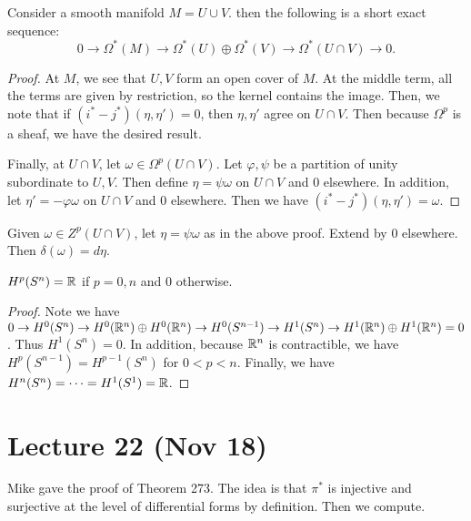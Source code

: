 \documentclass[twoside, 10pt]{article}
\begin{document}
    \begin{thm} Consider a smooth manifold $M = U \cup
        V$. then the following is a short exact sequence: \[ 0 \to \Omega^*(M)
        \to \Omega^*(U) \oplus \Omega^*(V) \to \Omega^*(U \cap V) \to 0.\]
    \end{thm}

    \begin{proof} At $M$, we see that $U,V$ form an open cover of $M$. At the
        middle term, all the terms are given by restriction, so the kernel
        contains the image. Then, we note that if $(i^* - j^*)(\eta, \eta') =
        0$, then $\eta, \eta'$ agree on $U \cap V$. Then because $\Omega^p$ is
        a sheaf, we have the desired result.

        Finally, at $U \cap V$, let $\omega \in \Omega^p(U \cap V)$. Let
    $\varphi, \psi$ be a partition of unity subordinate to $U,V$. Then define
$\eta = \psi \omega$ on $U \cap V$ and $0$ elsewhere. In addition, let $\eta' =
-\varphi\omega$ on $U \cap V$ and $0$ elsewhere. Then we have $(i^*-j^*)(\eta,
\eta') = \omega$.  \end{proof}

    \begin{cor} Given $\omega \in Z^p(U \cap V)$, let $\eta = \psi\omega$ as in
    the above proof. Extend by $0$ elsewhere. Then $\delta(\omega) = d\eta$.
\end{cor}

    \begin{thm} $H^p(S^n) = \mathbb{R}$ if $p = 0,n$ and  $0$ otherwise.  \end{thm}

    \begin{proof} Note we have $0 \to H^0(S^n) \to H^0(\mathbb{R}^n) \oplus H^0(\mathbb{R}^n)
        \to H^0(S^{n-1}) \to H^1(S^n) \to H^1(\mathbb{R}^n) \oplus H^1(\mathbb{R}^n) = 0$. Thus
        $H^1(S^n) = 0$.  In addition, because $\mathbb{R}^n$ is contractible, we have
        $H^p(S^{n-1}) = H^{p-1}(S^n)$ for $0 < p < n$. Finally, we have
        $H^n(S^n) = \cdots = H^1(S^1) = \mathbb{R}$.  \end{proof}

    \section{Lecture 22 (Nov 18)}%
    
    Mike gave the proof of Theorem 273. The idea is that $\pi^*$ is injective
    and surjective at the level of differential forms by definition. Then we
    compute.
\end{document}
